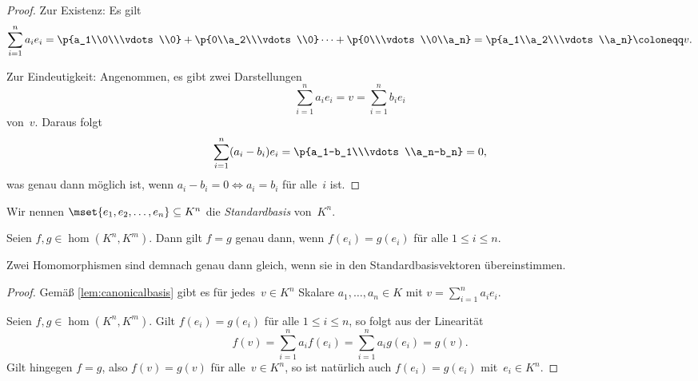 \documentclass[a4paper]{article}
\begin{document}
\begin{proof}
    Zur Existenz: Es gilt
    \begin{equation*}
        \sum_{i=1}^n a_ie_i = \p{a_1\\0\\\vdots\\0} + \p{0\\a_2\\\vdots\\0}\dots + \p{0\\\vdots\\0\\a_n} = \p{a_1\\a_2\\\vdots\\a_n} \coloneqq v.
    \end{equation*}

    Zur Eindeutigkeit: Angenommen, es gibt zwei Darstellungen
    \begin{equation*}
        \sum_{i=1}^n a_ie_i = v = \sum_{i=1}^n b_ie_i
    \end{equation*}
    von~$v$. Daraus folgt
    \begin{equation*}
        \sum_{i=1}^n (a_i-b_i)e_i = \p{a_1-b_1\\\vdots\\a_n-b_n} = 0,
    \end{equation*}
    was genau dann möglich ist, wenn $a_i-b_i = 0 \iff a_i = b_i$ für alle~$i$ ist.
\end{proof}

\begin{definition}[Standardbasis]
    Wir nennen $\mset{e_1,e_2,\dots,e_n} \subseteq K^n$ die \emph{Standardbasis} von~$K^n$.
\end{definition}


\begin{lemma}\label{lem:canonicalbasis:transformation}
    Seien $f,g \in \hom(K^n,K^m)$. Dann gilt $f = g$ genau dann, wenn $f(e_i) = g(e_i)$ für alle $1 \leq i \leq n$.
\end{lemma}

Zwei Homomorphismen sind demnach genau dann gleich, wenn sie in den Standardbasisvektoren übereinstimmen.

\begin{proof}
    Gemäß \cref{lem:canonicalbasis} gibt es für jedes~$v \in K^n$ Skalare $a_1,\dots,a_n \in K$ mit $v = \sum_{i=1}^n a_ie_i$.

    Seien $f,g \in \hom(K^n,K^m)$. Gilt $f(e_i) = g(e_i)$ für alle $1 \leq i \leq n$, so folgt aus der Linearität
    \begin{equation*}
        f(v) = \sum_{i=1}^n a_if(e_i) = \sum_{i=1}^n a_ig(e_i) = g(v).
    \end{equation*}
    Gilt hingegen $f = g$, also $f(v) = g(v)$ für alle~$v \in K^n$, so ist natürlich auch $f(e_i) = g(e_i)$ mit~$e_i \in K^n$.
\end{proof}
\end{document}

